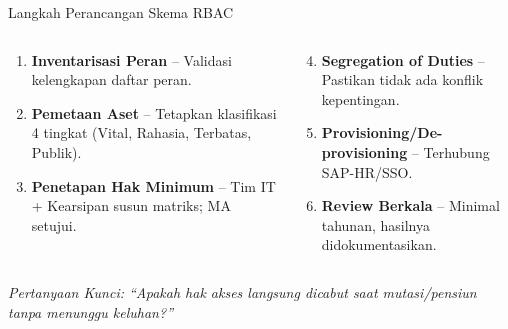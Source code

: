\documentclass[aspectratio=169,11pt]{beamer}
\begin{document}
\begin{frame}{Langkah Perancangan Skema RBAC}
    \vspace{0.2cm}
    \begin{columns}[T]
        \begin{premiumbox}
            \scriptsize
            \begin{enumerate}
                \item \textbf{Inventarisasi Peran} -- Validasi kelengkapan daftar peran.
                \item \textbf{Pemetaan Aset} -- Tetapkan klasifikasi 4 tingkat (Vital, Rahasia, Terbatas, Publik).
                \item \textbf{Penetapan Hak Minimum} -- Tim IT + Kearsipan susun matriks; MA setujui.
            \end{enumerate}
        \end{premiumbox}
        
        \begin{orangebox}
            \scriptsize
            \begin{enumerate}\setcounter{enumi}{3}
                \item \textbf{Segregation of Duties} -- Pastikan tidak ada konflik kepentingan.
                \item \textbf{Provisioning/De-provisioning} -- Terhubung SAP-HR/SSO.
                \item \textbf{Review Berkala} -- Minimal tahunan, hasilnya didokumentasikan.
            \end{enumerate}
        \end{orangebox}
    \end{columns}
    
    \vspace{0.2cm}
    \begin{center}
        \textcolor{plnblue}{\scriptsize\textit{Pertanyaan Kunci: ``Apakah hak akses langsung dicabut saat mutasi/pensiun tanpa menunggu keluhan?''}}
    \end{center}
\end{frame}
\end{document}
